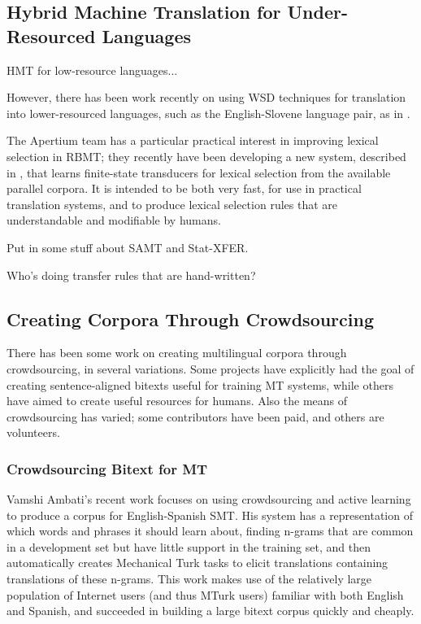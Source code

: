 \subsection{Hybrid Machine Translation for Under-Resourced Languages}
HMT for low-resource languages...

However, there has been work recently on using WSD techniques for translation
into lower-resourced languages, such as the English-Slovene language pair, as
in \cite{vintar-fivser-vrvsvcaj:2012:ESIRMT-HyTra2012}. 

The Apertium team has a particular practical interest in improving lexical
selection in RBMT; they recently have been developing
a new system, described in \cite{tyers-fst}, that learns finite-state
transducers for lexical selection from the available parallel corpora. It is
intended to be both very fast, for use in practical translation systems, and
to produce lexical selection rules that are understandable and modifiable by
humans.

Put in some stuff about SAMT and Stat-XFER.

Who's doing transfer rules that are hand-written?


\subsection{Creating Corpora Through Crowdsourcing}
There has been some work on creating multilingual corpora through
crowdsourcing, in several variations. Some projects have explicitly had the
goal of creating sentence-aligned bitexts useful for training MT systems, while
others have aimed to create useful resources for humans. Also the means of
crowdsourcing has varied; some contributors have been paid, and others are
volunteers.

\subsubsection{Crowdsourcing Bitext for MT}
Vamshi Ambati's recent work \cite{ambati_naacl,ambati_act} focuses on using
crowdsourcing and active learning to produce a corpus for English-Spanish SMT.
His system has a representation of which words and phrases it should learn
about, finding n-grams that are common in a development set but have little
support in the training set, and then automatically creates Mechanical Turk
tasks to elicit translations containing translations of these n-grams. This
work makes use of the relatively large population of Internet users (and thus
MTurk users) familiar with both English and Spanish, and succeeded in building
a large bitext corpus quickly and cheaply.

